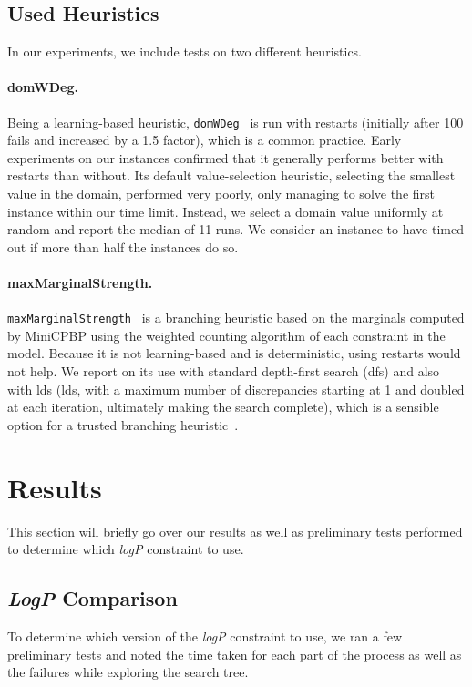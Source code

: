 \documentclass[../Document.tex]{subfiles}
\begin{document}
\subsection{Used Heuristics}
In our experiments, we include tests on two different heuristics.

\paragraph{domWDeg.} Being a learning-based heuristic, \texttt{domWDeg}~\cite{domwdeg} is run with restarts (initially after 100 fails and increased by a 1.5 factor), which is a common practice.
Early experiments on our instances confirmed that it generally performs better with restarts than without.
Its default value-selection heuristic, selecting the smallest value in the domain, performed very poorly, only managing to solve the first instance within our time limit.
Instead, we select a domain value uniformly at random and report the median of 11 runs. We consider an instance to have timed out if more than half the instances do so.

\paragraph{maxMarginalStrength.} \texttt{maxMarginalStrength}~\cite{GP:BP} is a branching heuristic based on the marginals computed by MiniCPBP using the weighted counting algorithm of each constraint in the model.
Because it is not learning-based and is deterministic, using restarts would not help.
We report on its use with standard depth-first search (\gls{dfs}) and also with \gls{lds} (\gls{lds}, with a maximum number of discrepancies starting at 1 and doubled at each iteration, ultimately making the search complete), which is a sensible option for a trusted branching heuristic~\cite{DBLP:conf/ijcai/HarveyG95}.


\section{Results}
This section will briefly go over our results as well as preliminary tests performed to determine which \emph{logP} constraint to use.

\subsection{\emph{LogP} Comparison}
To determine which version of the \emph{logP} constraint to use, we ran a few preliminary tests and noted the time taken for each part of the process as well as the failures while exploring the search tree.
\end{document}

